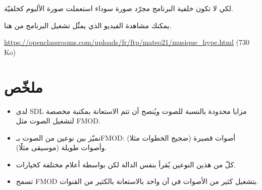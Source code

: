 لكي لا تكون خلفية البرنامج مجرّد صورة سوداء استعملت صورة الألبوم كخلفيّة.

يمكنك مشاهدة الفيديو الذي يمثّل تشغيل البرنامج من هنا.

\textenglish{\url{https://openclassrooms.com/uploads/fr/ftp/mateo21/musique_hype.html} (730 Ko)}

\section*{ملخّص}

\begin{itemize}
	\item لدى \textenglish{SDL}
	مزايا محدودة بالنسبة للصوت ويُنصح أن تتم الاستعانة بمكتبة مخصصة لتشغيل الصوت مثل
	\textenglish{FMOD}.
	\item نميّز بين نوعين من الصوت بـ\textenglish{FMOD}:
	أصوات قصيرة (ضجيج الخطوات مثلا) وأصوات طويلة (موسيقى مثلًا).
	\item كلّ من هذين النوعين يُقرأ بنفس الدالة لكن بواسطة أعلام مختلفة كخيارات.
	\item تسمح
	\textenglish{FMOD}
	بتشغيل كثير من الأصوات في آن واحد بالاستعانة بالكثير من القنوات.
\end{itemize}
